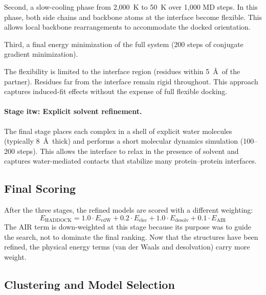 Second, a slow-cooling phase from 2,000~K to 50~K over 1,000 MD steps.
In this phase, both side chains and backbone atoms at the interface become flexible.
This allows local backbone rearrangements to accommodate the docked orientation.

Third, a final energy minimization of the full system (200 steps of conjugate gradient minimization).

The flexibility is limited to the interface region (residues within 5~\AA\ of the partner).
Residues far from the interface remain rigid throughout.
This approach captures induced-fit effects without the expense of full flexible docking.

\paragraph{Stage itw: Explicit solvent refinement.}

The final stage places each complex in a shell of explicit water molecules (typically 8~\AA\ thick) and performs a short molecular dynamics simulation (100--200 steps).
This allows the interface to relax in the presence of solvent and captures water-mediated contacts that stabilize many protein--protein interfaces.

\subsection{Final Scoring}

After the three stages, the refined models are scored with a different weighting:
\begin{equation}
\label{eq:haddock-score}
E_\text{HADDOCK} = 1.0 \cdot E_\text{vdW} + 0.2 \cdot E_\text{elec} + 1.0 \cdot E_\text{desolv} + 0.1 \cdot E_\text{AIR}
\end{equation}
The AIR term is down-weighted at this stage because its purpose was to guide the search, not to dominate the final ranking.
Now that the structures have been refined, the physical energy terms (van der Waals and desolvation) carry more weight.

\subsection{Clustering and Model Selection}

